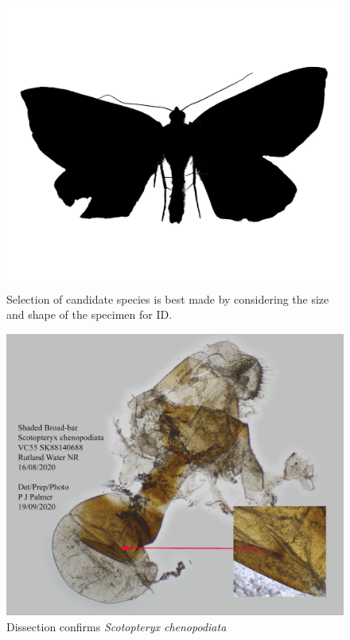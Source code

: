\documentclass[]{article}
\begin{document}
\begin{figure}
	\centering
	\includegraphics[width=0.7\linewidth]{S202012271445-silhouette.jpg}
	\caption{Selection of candidate species is best made by considering the size and shape of the specimen for ID.}
	\label{fig:s202012271445-silhouette}
\end{figure}

\begin{figure}
	\centering
	\includegraphics[width=0.7\linewidth]{202009131026PJP-3}
	\caption{Dissection confirms \textit{Scotopteryx chenopodiata}}
	\label{fig:202009131026pjp-3}
\end{figure}


%



\end{document}
